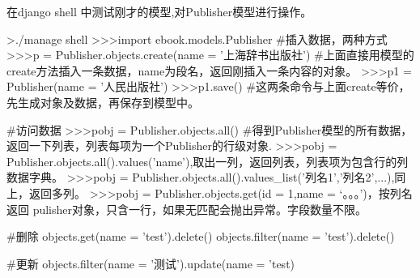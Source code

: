 \documentclass[a4paper]{ctexart}
\begin{document}
 在django shell 中测试刚才的模型,对Publisher模型进行操作。
 \begin{python}
   >./manage shell
   >>>import ebook.models.Publisher
   #插入数据，两种方式
   >>>p = Publisher.objects.create(name = '上海辞书出版社')
   #上面直接用模型的create方法插入一条数据，name为段名，返回刚插入一条内容的对象。
   >>>p1 = Publisher(name = '人民出版社')
   >>>p1.save()
   #这两条命令与上面create等价，先生成对象及数据，再保存到模型中。

   #访问数据
   >>>pobj = Publisher.objects.all()  #得到Publisher模型的所有数据，返回一下列表，列表每项为一个Publisher的行级对象.
   >>>pobj = Publisher.objects.all().values('name'),取出一列，返回列表，列表项为包含行的列数据字典。
   >>>pobj = Publisher.objects.all().values_list('列名1','列名2',...),同上，返回多列。
   >>>pobj = Publisher.objects.get(id = 1,name = ‘。。。’)，按列名返回 pulisher对象，只含一行，如果无匹配会抛出异常。字段数量不限。

   #删除
   objects.get(name = 'test').delete()
   objects.filter(name = 'test').delete()

   #更新
   objects.filter(name  = '测试').update(name = 'test)
      
 \end{python}
 
\end{document}
